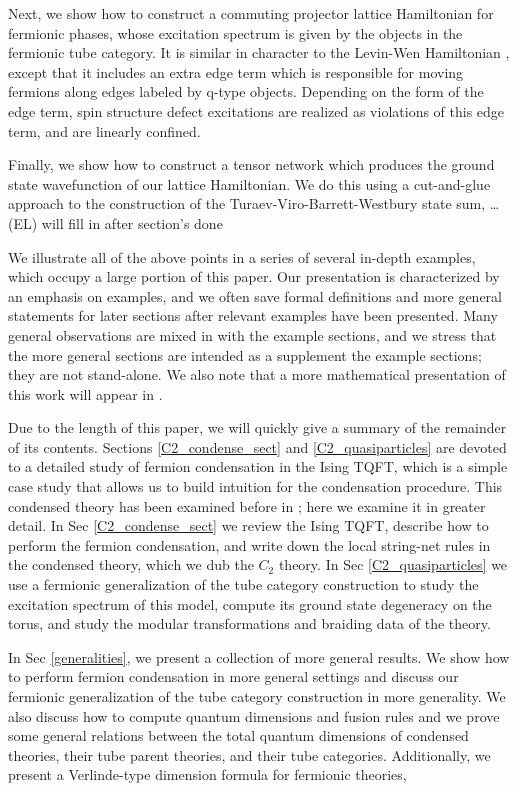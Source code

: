 \documentclass[12pt,a4paper]{article}
\newcommand{\ethan}[1]{{\color{amethyst}\footnotesize{(EL) #1}}}
\begin{document}
Next, we show how to construct a commuting projector lattice Hamiltonian 
for fermionic phases, whose excitation spectrum is given by the objects in the fermionic tube category.  
It is similar in character to the Levin-Wen Hamiltonian \cite{levin2005}, 
except that it includes an extra edge term which is responsible for moving fermions along
edges labeled by q-type objects. 
Depending on the form of the edge term, spin structure defect excitations 
are realized as violations of this edge term, and are linearly confined. 

Finally, we show how to construct a tensor network which produces the ground state 
wavefunction of our lattice Hamiltonian. We do this using a cut-and-glue approach to 
the construction of the Turaev-Viro-Barrett-Westbury state sum, \dots \ethan{will fill in after section's done}

We illustrate all of the above points in a series of several in-depth examples, which occupy a large portion 
of this paper.
Our presentation is characterized by an emphasis on examples, 
and we often save formal definitions and more general statements 
for later sections after relevant examples have been presented.  
Many general observations are mixed in with the example sections,
and we stress that the more general sections are intended as a supplement
the example sections; they are not stand-alone.
We also note that a more mathematical presentation of this work will appear in \cite{Kevin and scott's paper?}. 


Due to the length of this paper, we will quickly give a summary of the remainder of its contents.
Sections \ref{C2_condense_sect} and \ref{C2_quasiparticles} are devoted to a detailed study of 
fermion condensation in the Ising TQFT, which is a simple case study that allows us to build intuition for the condensation procedure.
This condensed theory has been examined before in \cite{bhardwaj2016, kapustin2017}; 
here we examine it in greater detail. 
In Sec \ref{C2_condense_sect} we review the Ising TQFT, describe how to perform the 
fermion condensation, and write down the local string-net rules in the condensed theory, 
which we dub the $C_2$ theory. 
In Sec \ref{C2_quasiparticles} we use a fermionic generalization of the tube category 
construction to study the excitation spectrum of this model, compute its ground state 
degeneracy on the torus, and study the modular transformations and braiding data of 
the theory. 

In Sec \ref{generalities}, we present a collection of more general results. 
We show how to perform fermion condensation in more general settings
and discuss our fermionic generalization 
of the tube category construction in more generality.
We also discuss how to compute quantum dimensions and fusion rules
and we prove some general
relations between the total quantum dimensions of condensed theories, their 
tube parent theories, and their tube categories.
Additionally, we present a Verlinde-type
dimension formula for fermionic theories,
\end{document}
